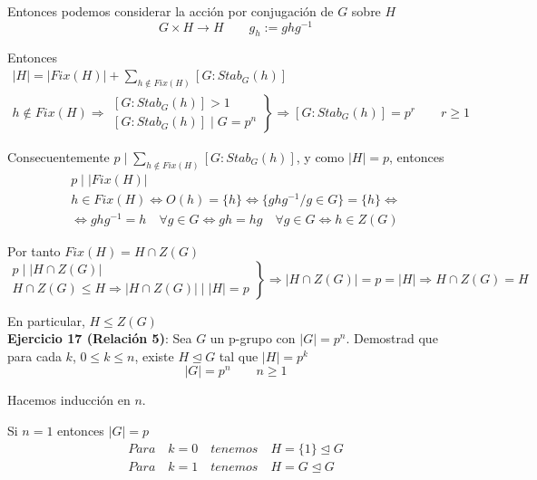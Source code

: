 \documentclass{article}
\begin{document}
Entonces podemos considerar la acción por conjugación de $G$ sobre $H$
\begin{equation*}
G\times H\longrightarrow H\qquad g_h:=ghg^{-1}
\end{equation*}

Entonces
\begin{gather*}
|H|=|Fix(H)|+\sum_{h\notin Fix(H)} \left[G:Stab_G(h)\right] \\
h\notin Fix(H)\Rightarrow \left.\begin{array}{c}
\left[G:Stab_G(h)\right]>1\\
\left[G:Stab_G(h)\right]\mid G=p^n
\end{array} \right\rbrace \Rightarrow \left[G:Stab_G(h)\right] =p^r \qquad r\geq 1
\end{gather*}

Consecuentemente $p\mid \sum_{h\notin Fix(H)}\left[G:Stab_G(h)\right]$, y como $|H|=p$, entonces
\begin{gather*}
p\mid |Fix(H)| \\
h\in Fix(H)\Leftrightarrow O(h)=\{h\}\Leftrightarrow\{ghg^{-1}/g\in G\}=\{h\} \Leftrightarrow\\
\Leftrightarrow ghg^{-1}=h\quad \forall g\in G\Leftrightarrow gh=hg \quad \forall g\in G\Leftrightarrow h\in Z(G)
\end{gather*}

Por tanto $Fix(H)=H\cap Z(G)$
\begin{equation*}
\left.\begin{array}{c}
p\mid |H\cap Z(G)| \\
H\cap Z(G)\leq H\Rightarrow |H\cap Z(G)|\mid |H|=p
\end{array}\right\rbrace \Rightarrow |H\cap Z(G)|=p=|H|\Rightarrow H\cap Z(G)=H
\end{equation*}

En particular, $H\leq Z(G)$ \\

\textbf{Ejercicio 17 (Relación 5)}: Sea $G$ un p-grupo con $|G|=p^n$. Demostrad que para cada $k$, $0\leq k\leq n$, existe $H\unlhd G$ tal que $|H|=p^k$
\begin{equation*}
|G|=p^n\qquad n\geq 1
\end{equation*}

Hacemos inducción en $n$.

Si $n=1$ entonces $|G|=p$
\begin{equation*}
\left.\begin{array}{c}
Para \quad k=0\quad tenemos \quad H=\{1\}\unlhd G \\
Para \quad k=1\quad tenemos \quad H=G\unlhd G
\end{array} \right.
\end{equation*}
\end{document}
